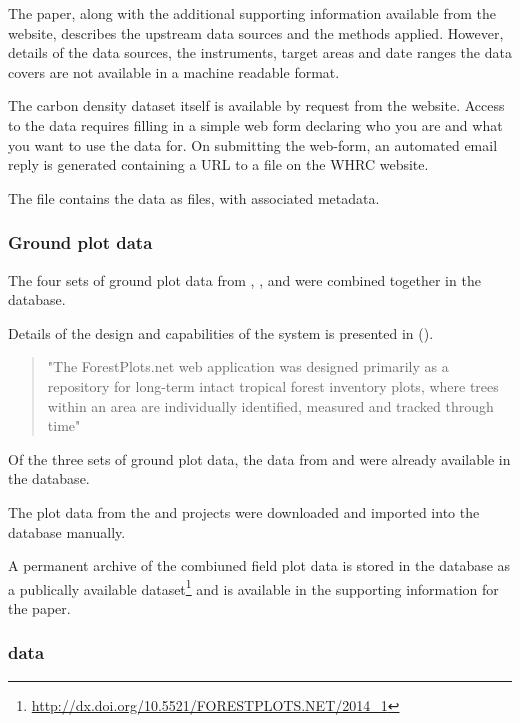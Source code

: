\documentclass{article}
\begin{document}
The paper, along with the additional supporting information available from
the \cite{journal-nature} website,
describes the upstream data sources and the methods applied.
However, details of the data sources, the instruments, target areas and date ranges
the data covers are not available in a machine readable format.

The carbon density dataset itself is available by request from the 
\cite{whrc-data} website.
Access to the data requires filling in a simple web form declaring
who you are and what you want to use the data for.
On submitting the web-form, an automated email reply is generated
containing a URL to a \cite{format-zip}
file on the WHRC website.

The \cite{format-zip} file contains the data as \cite{format-geotiff}
files, with associated \cite{format-world} metadata.

\subsubsection{Ground plot data}

The four sets of ground plot data from
\cite{rainfor}, \cite{atdn}, \cite{team}
and \cite{ppbio}
were combined together in the 
\cite{forest-plots}
database.

Details of the design and capabilities of the \cite{forest-plots}
system is presented in  (\cite{gonzalez-2011}).

\begin{quote}
"The ForestPlots.net web application was designed primarily
as a repository for long-term intact tropical forest inventory
plots, where trees within an area are individually identified,
measured and tracked through time"
\end{quote}

Of the three sets of ground plot data, the data from \cite{rainfor} and
\cite{atdn} were already available in the \cite{forest-plots} database.

The plot data from the \cite{team} and \cite{ppbio} projects were
downloaded and imported into the \cite{forest-plots} database manually.

A permanent archive of the combiuned field plot data
is stored in the \cite{forest-plots} database
as a publically available dataset\footnote{\url{http://dx.doi.org/10.5521/FORESTPLOTS.NET/2014_1}}
and is available in the supporting information for the paper. 

\subsubsection{\cite{term-agb} data}
\end{document}
